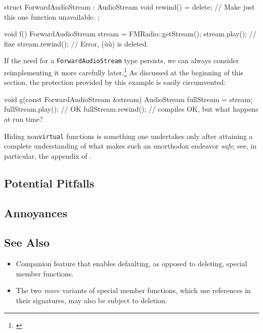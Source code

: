 \begin{emcppslisting}[emcppsbatch=e2]
struct ForwardAudioStream : AudioStream
{
    void rewind() = delete; // Make just this one function unavailable.
};

void f()
{
    ForwardAudioStream stream = FMRadio::getStream();
    stream.play();   // fine
    stream.rewind(); // Error, (ù{}ù) is deleted.
}
\end{emcppslisting}

\noindent If the need for a \lstinline!ForwardAudioStream! type persists, we can always
consider reimplementing it more carefully later.{\cprotect\footnote{\cite[sections 3.5.10.5 and 3.7.3, pp.~687--703 and 726--727]{lakos20}}} As discussed at the beginning of this section, the protection provided by this example is easily circumvented:
\begin{emcppslisting}[emcppsbatch=e2]
void g(const ForwardAudioStream &stream)
{
    AudioStream fullStream = stream;
    fullStream.play();   // OK
    fullStream.rewind(); // compiles OK, but what happens at run time?
}
\end{emcppslisting}

\noindent Hiding non\lstinline!virtual! functions is something one undertakes only after attaining a complete understanding of what makes such an unorthodox endeavor \emph{safe}; see, in particular, the appendix of .

\subsection[Potential Pitfalls]{Potential Pitfalls}\label{potential-pitfalls}

\hspace*{\fill}

\subsection[Annoyances]{Annoyances}\label{annoyances}

\hspace*{\fill}

\subsection[See Also]{See Also}\label{see-also}

\begin{itemize}
\item{%
Companion feature that enables defaulting, as opposed to deleting, special member functions.}
\item{%
The two \emph{move} variants of special member functions, which use  references in their signatures, may also be subject to deletion.}
\end{itemize}

